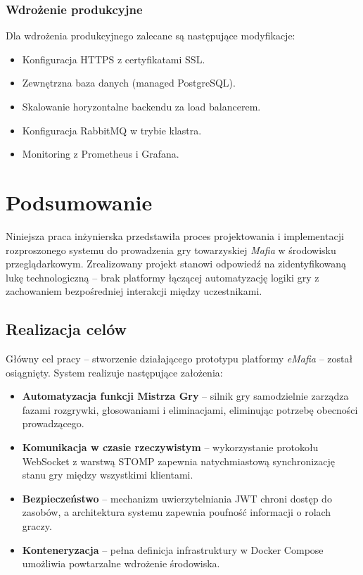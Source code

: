 ﻿\documentclass[a4paper,twoside,11pt]{mwrep}
\theoremstyle{plain} \newtheorem{thm}{Twierdzenie}
\theoremstyle{plain} \newtheorem{lem}{Lemat}
\theoremstyle{definition} \newtheorem{defn}{Definicja}
\theoremstyle{remark} \newtheorem*{rem}{Wniosek}
\begin{document}
\subsection{Wdrożenie produkcyjne}

Dla wdrożenia produkcyjnego zalecane są następujące modyfikacje:
\begin{itemize}
    \item Konfiguracja HTTPS z certyfikatami SSL.
    \item Zewnętrzna baza danych (managed PostgreSQL).
    \item Skalowanie horyzontalne backendu za load balancerem.
    \item Konfiguracja RabbitMQ w trybie klastra.
    \item Monitoring z Prometheus i Grafana.
\end{itemize}
\chapter*{Podsumowanie}

Niniejsza praca inżynierska przedstawiła proces projektowania i implementacji rozproszonego systemu do prowadzenia gry towarzyskiej \textit{Mafia} w środowisku przeglądarkowym. Zrealizowany projekt stanowi odpowiedź na zidentyfikowaną lukę technologiczną -- brak platformy łączącej automatyzację logiki gry z zachowaniem bezpośredniej interakcji między uczestnikami.

\section*{Realizacja celów}

Główny cel pracy -- stworzenie działającego prototypu platformy \textit{eMafia} -- został osiągnięty. System realizuje następujące założenia:

\begin{itemize}
    \item \textbf{Automatyzacja funkcji Mistrza Gry} -- silnik gry samodzielnie zarządza fazami rozgrywki, głosowaniami i eliminacjami, eliminując potrzebę obecności prowadzącego.
    
    \item \textbf{Komunikacja w czasie rzeczywistym} -- wykorzystanie protokołu WebSocket z warstwą STOMP zapewnia natychmiastową synchronizację stanu gry między wszystkimi klientami.
    
    \item \textbf{Bezpieczeństwo} -- mechanizm uwierzytelniania JWT chroni dostęp do zasobów, a architektura systemu zapewnia poufność informacji o rolach graczy.
    
    \item \textbf{Konteneryzacja} -- pełna definicja infrastruktury w Docker Compose umożliwia powtarzalne wdrożenie środowiska.
\end{itemize}
\end{document}
